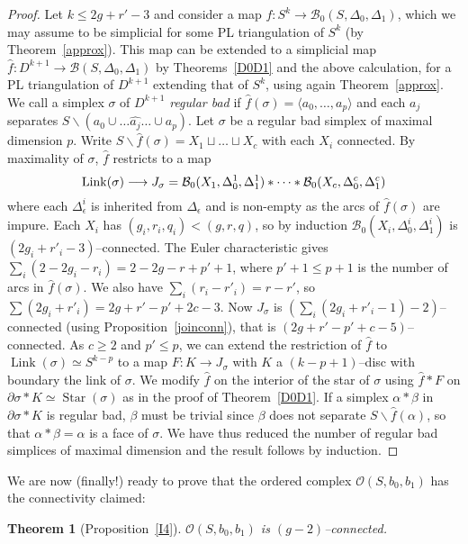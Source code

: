 \documentclass[10pt]{amsart}
\newtheorem{thm}{Theorem}[section]
\newcommand{\BB}{\mathcal{B}}
\newcommand{\OO}{\mathcal{O}}
\newcommand{\al}{\alpha}
\newcommand{\De}{\Delta}
\newcommand{\s}{\sigma}
\newcommand{\rar}{\longrightarrow}
\newcommand{\minus}{\backslash}
\newcommand{\lgl}{\langle}
\newcommand{\rgl}{\rangle}
\newcommand{\del}{\partial}
\newcommand{\link}{\operatorname{Link}}
\newcommand{\Star}{\operatorname{Star}}
\begin{document}
\begin{proof}
Let $k\le 2g+r'-3$ and consider a map $f\colon S^k\to \BB_0(S,\De_0,\De_1)$, which we may assume to be simplicial for some PL triangulation of $S^k$ (by
Theorem~\ref{approx}).  This map can be extended to a simplicial map $\hat f\colon D^{k+1}\to \BB(S,\De_0,\De_1)$ by 
Theorems~\ref{D0D1} and the above calculation, for a PL triangulation of $D^{k+1}$ extending that of $S^k$, using again Theorem~\ref{approx}. 
We call a simplex $\s$ of $D^{k+1}$ {\em regular bad} if $\hat f(\s)=\lgl a_0,\dots,a_p\rgl$ and each $a_j$ separates
$S\minus(a_0\cup\dots\widehat{a_j}\dots\cup a_p)$. 
Let $\s$ be a regular bad simplex of maximal dimension $p$. Write $S\minus\hat f(\s)=X_1\sqcup\dots\sqcup X_c$ with each $X_i$ connected. 
By maximality of $\s$, $\hat f$ restricts to a map 
$${\rm Link}(\s)\rar J_\s=\BB_0(X_1,\De_0^1,\De_1^1)*\dots * \BB_0(X_c,\De_0^c,\De_1^c)$$
where each $\De^i_\epsilon$  is inherited from $\De_\epsilon$ and is non-empty as the arcs of $\hat f(\s)$ are impure. Each $X_i$  has
$(g_i,r_i,q_i)<(g,r,q)$, so by induction 
$\BB_0(X_i,\De_0^i,\De_1^i)$ is $(2g_i+r'_i-3)$--connected. The Euler characteristic gives $\sum_i(2-2g_i-r_i)=2-2g-r+p'+1$, where $p'+1\le p+1$ is the
number of arcs in $\hat f(\s)$. We also have $\sum_i(r_i-r'_i)=r-r'$, so $\sum (2g_i+r'_i)=2g+r'-p'+2c-3$. 
Now  $J_\s$ is 
$(\sum_i(2g_i+r'_i-1)-2)$--connected (using Proposition~\ref{joinconn}), that is $(2g+r'-p'+c-5)$--connected. As $c\ge 2$ and $p'\le p$, 
we can extend the restriction of $\hat f$ to $\link({\s})\simeq S^{k-p}$ to a map $F\colon K\to J_\s$ with $K$ a $(k-p+1)$--disc with boundary
the link of $\s$. 
We modify $\hat f$ on the interior of the star of $\s$ using $\hat f * F$  on $\del \s * K\simeq \Star(\s)$ as in the proof of Theorem~\ref{D0D1}. 
If a simplex $\al * \beta$ in $\del\s * K$ is regular bad, $\beta$ must be trivial since $\beta$ does not separate $S\minus\hat f(\al)$, so that $\al * \beta=\al$ is a face of $\s$. We have thus  reduced the number of regular bad simplices of maximal dimension and the result follows by induction. 
\end{proof}



We are now (finally!) ready to prove that the ordered complex $\OO(S,b_0,b_1)$ has the connectivity claimed: 

\begin{thm}[Proposition~\ref{I4}]\label{OS}
$\OO(S,b_0,b_1)$ is $(g-2)$--connected. 
\end{thm}
\end{document}
